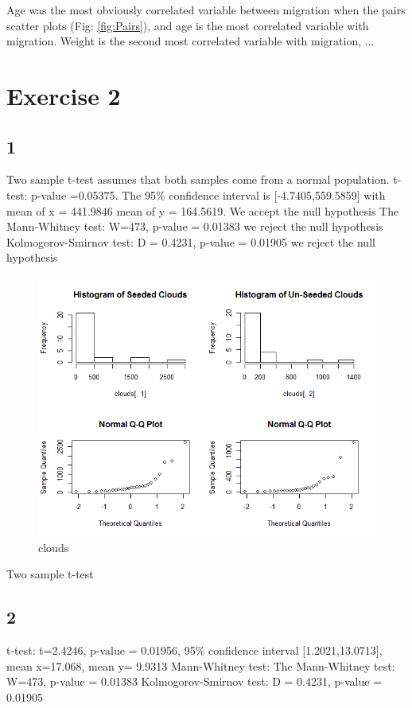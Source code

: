 \documentclass{article}
\begin{document}
    Age was the most obviously correlated variable between migration when the pairs scatter plots (Fig: \ref{fig:Pairs}), and age is the most correlated variable with migration.
    Weight is the second most correlated variable with migration, ...
    
    \section{Exercise 2}
    \subsection*{1}
    
    Two sample t-test assumes that both samples come from a normal population. 
    t-test: p-value =0.05375. The 95\% confidence interval is [-4.7405,559.5859] with mean of x = 441.9846 mean of y = 164.5619.
    We accept the null hypothesis
    The Mann-Whitney test: W=473, p-value = 0.01383
    we reject the null hypothesis
    Kolmogorov-Smirnov test: D = 0.4231, p-value = 0.01905
    we reject the null hypothesis
    
    \begin{figure}[!htb]
      \includegraphics[scale=0.4]{../results/2_1.png}
      \caption{clouds}
      \label{fig:clouds}
    \end{figure}
    
    Two sample t-test
    
    \subsection*{2}
    t-test: t=2.4246, p-value = 0.01956, 95\% confidence interval [1.2021,13.0713], mean x=17.068, mean y= 9.9313
    Mann-Whitney test: The Mann-Whitney test: W=473, p-value = 0.01383
    Kolmogorov-Smirnov test: D = 0.4231, p-value = 0.01905
    
\end{document}
